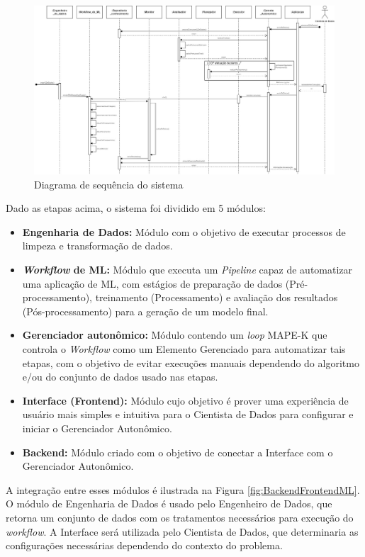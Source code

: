 \documentclass[portugues]{ic-tese}
\begin{document}
\begin{figure}
\clearpage
\includegraphics[scale=0.465]{images/Diagrama_Sequencia.jpg}
\caption {Diagrama de sequência do sistema}
\label{fig:DiagramaSequencia}
\end{figure}

Dado as etapas acima, o sistema foi dividido em 5 módulos:

\begin{itemize}
    \item {\textbf{Engenharia de Dados:}} Módulo com o objetivo de executar processos de limpeza e transformação de dados.
	\item {\textbf{\textit{Workflow} de ML:}} Módulo que executa um \textit{Pipeline} capaz de automatizar uma aplicação de ML, com estágios de preparação de dados (Pré-processamento), treinamento (Processamento) e avaliação dos resultados (Pós-processamento) para a geração de um modelo final.
     \item {\textbf{Gerenciador autonômico:}} Módulo contendo um \textit{loop} MAPE-K que controla o \textit{Workflow} como um Elemento Gerenciado para automatizar tais etapas, com o objetivo de evitar execuções manuais dependendo do algoritmo e/ou do conjunto de dados usado nas etapas.
     \item {\textbf{Interface (Frontend):}} Módulo cujo objetivo é prover uma experiência de usuário mais simples e intuitiva para o Cientista de Dados para configurar e iniciar o Gerenciador Autonômico.
	\item {\textbf{Backend:}} Módulo criado com o objetivo de conectar a Interface com o Gerenciador Autonômico.
\end{itemize}

A integração entre esses módulos é ilustrada na Figura \ref{fig:BackendFrontendML}. O módulo de Engenharia de Dados é usado pelo Engenheiro de Dados, que retorna um conjunto de dados com os tratamentos necessários para execução do \textit{workflow}. A Interface será utilizada pelo Cientista de Dados, que determinaria as configurações necessárias dependendo do contexto do problema. 
\end{document}
